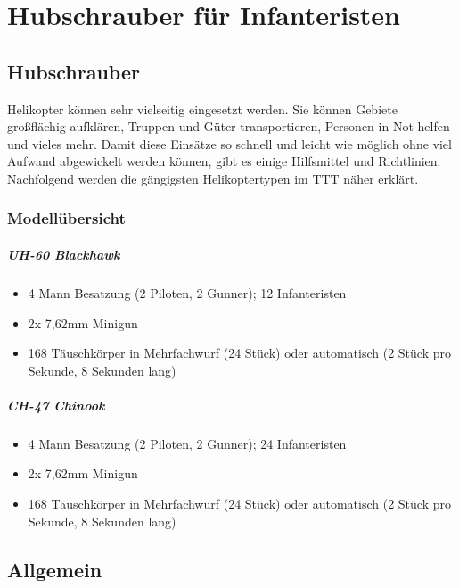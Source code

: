 \chapter{Hubschrauber für Infanteristen}
\label{HuFIn}
\section{Hubschrauber}
Helikopter können sehr vielseitig eingesetzt werden. Sie können Gebiete großflächig 
aufklären, Truppen und Güter transportieren, Personen in Not helfen und vieles mehr. Damit  
diese Einsätze so schnell und leicht wie möglich ohne viel Aufwand abgewickelt werden 
können, gibt es einige Hilfsmittel und Richtlinien. Nachfolgend werden die gängigsten 
Helikoptertypen im TTT näher erklärt. 
\subsection{Modellübersicht}
\paragraph*{UH-60 Blackhawk}
\begin{itemize}
	\item 4 Mann Besatzung (2 Piloten, 2 Gunner); 12 Infanteristen 
	\item 2x 7,62mm Minigun 
	\item 168 Täuschkörper in Mehrfachwurf (24 Stück) oder automatisch (2 Stück pro 
	Sekunde, 8 Sekunden lang) 
\end{itemize}
\paragraph*{CH-47 Chinook}
\begin{itemize}
	\item 4 Mann Besatzung (2 Piloten, 2 Gunner); 24 Infanteristen 
	\item 2x 7,62mm Minigun 
	\item 168 Täuschkörper in Mehrfachwurf (24 Stück) oder automatisch (2 Stück pro 
	Sekunde, 8 Sekunden lang) 
\end{itemize}

\section{Allgemein}
